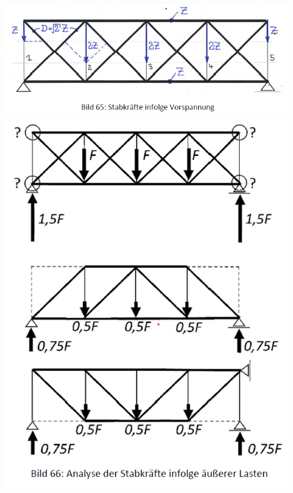\documentclass[fleqn,twoside]{article}
\begin{document}
        \begin{minipage}{0.4\textwidth}
            \includegraphics[width=0.95\textwidth]{Grafiken/Beurteilen alter Holzkonstruktionen/Kraftfluesse/Howescher Traeger - Vorspannung.png}\\
            \includegraphics[width=0.95\textwidth]{Grafiken/Beurteilen alter Holzkonstruktionen/Kraftfluesse/Howescher Traeger - Aussere Lasten.png}
        \end{minipage}
        
\end{document}
